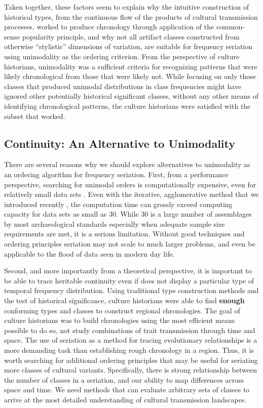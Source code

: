 \documentclass[graybox,natbib]{svmult}
\begin{document}
Taken together, these factors seem to explain why the intuitive
construction of historical types, from the continuous flow of the
products of cultural transmission processes, worked to produce
chronology through application of the common-sense popularity principle,
and why not all artifact classes constructed from otherwise
``stylistic'' dimensions of variation, are suitable for frequency
seriation using unimodality as the ordering criterion. From the
perspective of culture historians, unimodality was a sufficient criteria
for recognizing patterns that were likely chronological from those that
were likely not. While focusing on only those classes that produced
unimodal distributions in class frequencies might have ignored other
potentially historical significant classes, without any other means of
identifying chronological patterns, the culture historians were
satisfied with the subset that worked.

\subsection{Continuity: An Alternative to
Unimodality}\label{continuity-an-alternative-to-unimodality}

There are several reasons why we should explore alternatives to
unimodality as an ordering algorithm for frequency seriation. First,
from a performance perspective, searching for unimodal orders is
computationally expensive, even for relatively small data sets
\citep{Madsen2014}. Even with the iterative, agglomerative method that
we introduced recently \citep{lipomadsendunnell2015}, the computation
time can grossly exceed computing capacity for data sets as small as 30.
While 30 is a large number of assemblages by most archaeological
standards especially when adequate sample size requirements are met, it
is a serious limitation. Without good techniques and ordering principles
seriation may not scale to much larger problems, and even be applicable
to the flood of data seen in modern day life.

Second, and more importantly from a theoretical perspective, it is
important to be able to trace heritable continuity even if does not
display a particular type of temporal frequency distribution. Using
traditional type construction methods and the test of historical
significance, culture historians were able to find \textbf{enough}
conforming types and classes to construct regional chronologies. The
goal of culture historians was to build chronologies using the most
efficient means possible to do so, not study combinations of trait
transmission through time and space. The use of seriation as a method
for tracing evolutionary relationships is a more demanding task than
establishing rough chronology in a region. Thus, it is worth searching
for additional ordering principles that may be useful for seriating more
classes of cultural variants. Specifically, there is strong relationship
between the number of classes in a seriation, and our ability to map
differences across space and time. We need methods that can evaluate
arbitrary sets of classes to arrive at the most detailed understanding
of cultural transmission landscapes.
\end{document}
